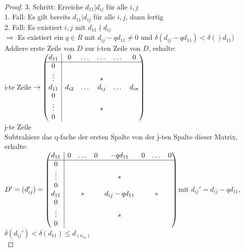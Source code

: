 \documentclass[10pt,a4paper,numbers=endperiod]{scrartcl}
\theoremstyle{definition}
\begin{document}
\begin{proof}
	3. Schritt: Erreiche $d_{11}|d_{ij}$ für alle $i,j$\\
	1. Fall: Es gilt bereits $d_{11}|d_{ij}$ für alle $i,j$, dann fertig\\
	2. Fall: Es existiert $i,j$ mit $d_{11} \nmid d_{ij}$\\
	$\Rightarrow$ Es existiert ein $q \in R$ mit $d_{ij} - q d_{11} \neq 0$ und $\delta(d_{ij} - q d_{11}) < \delta()d_{11})$\\
	Addiere erste Zeile von $D$ zur i-ten Zeile von $D$, erhalte:\\
	
	i-te Zeile $\rightarrow \begin{pmatrix}
	\multicolumn{1}{c|}{d_{11}} & 0 & \dots & \dots & \dots & 0\\
	\hline
	\multicolumn{1}{c|}{0} &  & &  & &\\
	\multicolumn{1}{c|}{\vdots} & & &* &&\\
	\multicolumn{1}{c|}{d_{11}} & d_{i2} & \dots & d_{ij} & \dots & d_{in}\\
	\multicolumn{1}{c|}{0} &  & &  & &\\
	\multicolumn{1}{c|}{\vdots} & & & * &&\\
	\multicolumn{1}{c|}{0} &  & &  & &\\
	\end{pmatrix}$\\
	\hspace*{46 mm} j-te Zeile\\
	
	Subtrahiere das q-fache der ersten Spalte von der j-ten Spalte dieser Matrix, erhalte:\\
	
	$D' = (d_{ij}') = \begin{pmatrix}
	\multicolumn{1}{c|}{d_{11}} & 0 & \dots & 0 & -q d_{11} & 0 & \dots & 0\\
	\hline
	\multicolumn{1}{c|}{0} & & & & &  & &\\
	\multicolumn{1}{c|}{\vdots} & & & & * & & &\\
	\multicolumn{1}{c|}{0} & & & & &  & &\\
	\multicolumn{1}{c|}{d_{11}} &  & * & & d_{ij} - q d_{11} &  & * &\\
	\multicolumn{1}{c|}{0} &  & &  & & & & \\
	\multicolumn{1}{c|}{\vdots} & & & & * & &&\\
	\multicolumn{1}{c|}{0} &  & & & & & &
	\end{pmatrix}$mit $d_{ij}' = d_{ij} - q d_{11}$, $\delta(d_{ij}') < \delta(d_{11}) \leq d_(a_{11})$\\
	

\end{proof}
\end{document}
